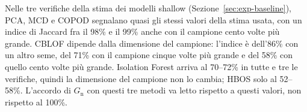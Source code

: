 Nelle tre verifiche della stima dei modelli shallow (Sezione~\ref{sec:exp-baseline}), PCA, MCD e COPOD segnalano quasi gli stessi valori della stima usata, con un indice di Jaccard fra il 98\% e il 99\% anche con il campione cento volte più grande. CBLOF dipende dalla dimensione del campione: l'indice è dell'86\% con un altro seme, del 71\% con il campione cinque volte più grande e del 58\% con quello cento volte più grande. Isolation Forest arriva al 70--72\% in tutte e tre le verifiche, quindi la dimensione del campione non lo cambia; HBOS solo al 52--58\%. L'accordo di $G_{\mathrm{n}}$ con questi tre metodi va letto rispetto a questi valori, non rispetto al 100\%.

